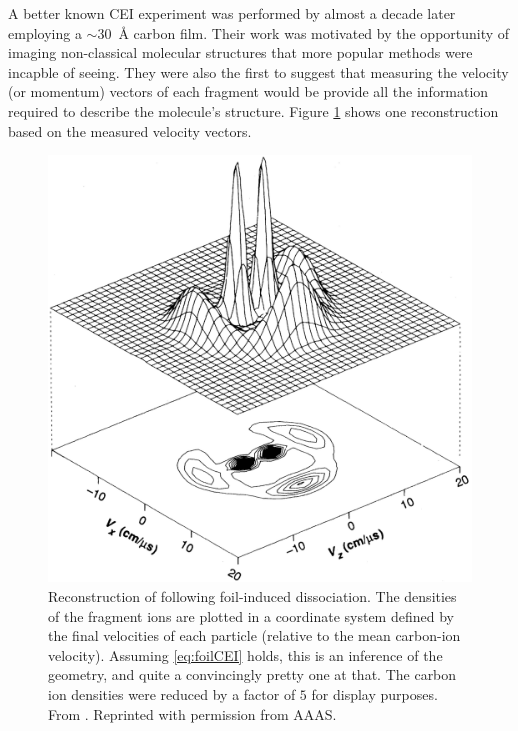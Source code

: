A better known CEI experiment was performed by \citet{Vager89} almost a decade later employing a $\sim$\SI{30}{\angstrom} carbon film. Their work was motivated by the opportunity of imaging non-classical molecular structures that more popular methods were incapble of seeing. They were also the first to suggest that measuring the velocity (or momentum) vectors of each fragment would be provide all the information required to describe the molecule's structure. Figure \ref{fig:C2H3geometry} shows one reconstruction based on the measured velocity vectors.

\begin{figure}
  \centering
  \includegraphics[width=\textwidth]{gfx/VagerPseudoGeometry}
  \caption[Reconstruction of  following foil-induced dissociation.]
  {Reconstruction of  following foil-induced dissociation. The densities of the fragment ions are plotted in a coordinate system defined by the final velocities of each particle (relative to the mean carbon-ion velocity). Assuming \eqref{eq:foilCEI} holds, this is an inference of the geometry, and quite a convincingly pretty one at that. The carbon ion densities were reduced by a factor of $5$ for display purposes. From \citet{Vager89}. Reprinted with permission from AAAS.}
  \label{fig:C2H3geometry}
\end{figure}

